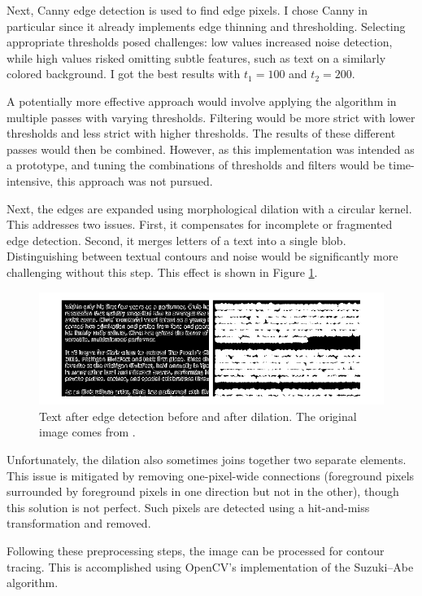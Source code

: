 \documentclass[
  digital,     %
  oneside,     %
  nosansbold,  %
  nocolorbold, %
  lof,         %
  lot,         %
]{fithesis4}
\begin{document}
Next, Canny edge detection is used to find edge pixels. I chose Canny in particular since it already implements edge thinning and thresholding. Selecting appropriate thresholds posed challenges: low values increased noise detection, while high values risked omitting subtle features, such as text on a similarly colored background. I got the best results with $t_1=100$ and $t_2=200$.

A potentially more effective approach would involve applying the algorithm in multiple passes with varying thresholds. Filtering would be more strict with lower thresholds and less strict with higher thresholds. The results of these different passes would then be combined. However, as this implementation was intended as a prototype, and tuning the combinations of thresholds and filters would be time-intensive, this approach was not pursued.

Next, the edges are expanded using morphological dilation with a circular kernel. This addresses two issues. First, it compensates for incomplete or fragmented edge detection. Second, it merges letters of a text into a single blob. Distinguishing between textual contours and noise would be significantly more challenging without this step. This effect is shown in Figure \ref{fig:dilation}.

\begin{figure}
    \centering
    \includegraphics[width=1\linewidth]{diagrams/dilation.pdf}
    \caption{Text after edge detection before and after dilation. The original image comes from \cite{aydos2020}.}
    \label{fig:dilation}
\end{figure}

Unfortunately, the dilation also sometimes joins together two separate elements. This issue is mitigated by removing one-pixel-wide connections (foreground pixels surrounded by foreground pixels in one direction but not in the other), though this solution is not perfect. Such pixels are detected using a hit-and-miss transformation and removed.

Following these preprocessing steps, the image can be processed for contour tracing. This is accomplished using OpenCV's implementation of the Suzuki–Abe algorithm.
\end{document}
